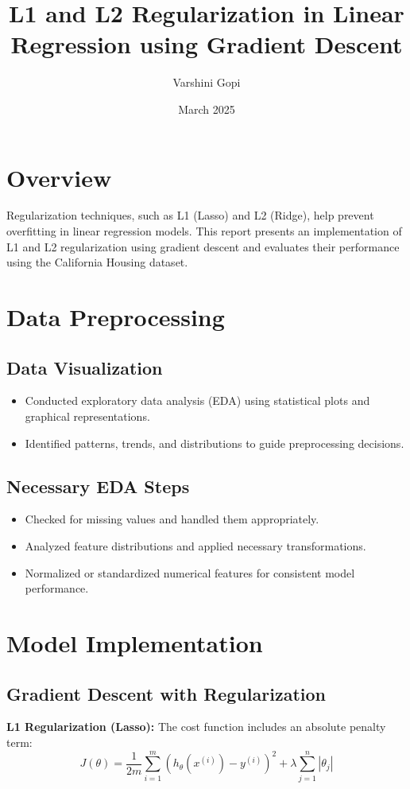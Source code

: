 \documentclass{article}
\title{L1 and L2 Regularization in Linear Regression using Gradient Descent}
\author{Varshini Gopi}
\date{March 2025}
\begin{document}
\maketitle

\section{Overview}
Regularization techniques, such as L1 (Lasso) and L2 (Ridge), help prevent overfitting in linear regression models. This report presents an implementation of L1 and L2 regularization using gradient descent and evaluates their performance using the California Housing dataset.

\section{Data Preprocessing}

\subsection{Data Visualization}
\begin{itemize}
    \item Conducted exploratory data analysis (EDA) using statistical plots and graphical representations.
    \item Identified patterns, trends, and distributions to guide preprocessing decisions.
\end{itemize}

\subsection{Necessary EDA Steps}
\begin{itemize}
    \item Checked for missing values and handled them appropriately.
    \item Analyzed feature distributions and applied necessary transformations.
    \item Normalized or standardized numerical features for consistent model performance.
\end{itemize}

\section{Model Implementation}

\subsection{Gradient Descent with Regularization}
\textbf{L1 Regularization (Lasso):} The cost function includes an absolute penalty term:
\begin{equation}
    J(\theta) = \frac{1}{2m} \sum_{i=1}^{m} (h_\theta(x^{(i)}) - y^{(i)})^2 + \lambda \sum_{j=1}^{n} |\theta_j|
\end{equation}
\end{document}
